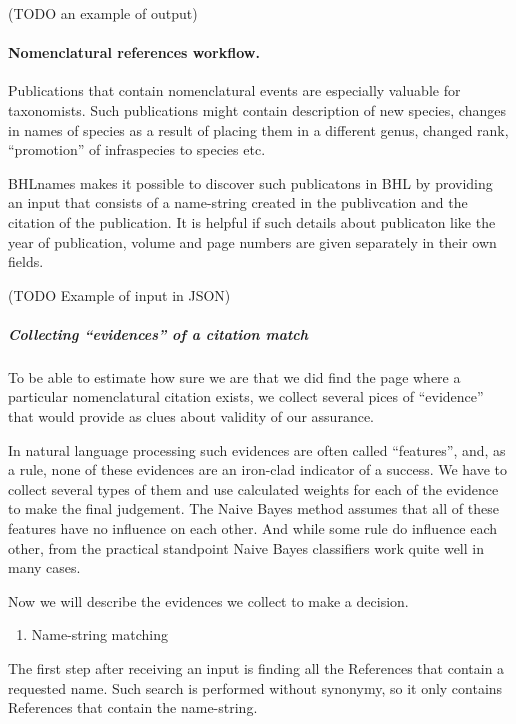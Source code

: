 \documentclass[
]{article}
\providecommand{\tightlist}{%
  \setlength{\itemsep}{0pt}\setlength{\parskip}{0pt}}
\begin{document}
(TODO an example of output)

\hypertarget{nomenclatural-references-workflow.}{%
\paragraph{Nomenclatural references
workflow.}\label{nomenclatural-references-workflow.}}

Publications that contain nomenclatural events are especially valuable
for taxonomists. Such publications might contain description of new
species, changes in names of species as a result of placing them in a
different genus, changed rank, ``promotion'' of infraspecies to species
etc.

BHLnames makes it possible to discover such publicatons in BHL by
providing an input that consists of a name-string created in the
publivcation and the citation of the publication. It is helpful if such
details about publicaton like the year of publication, volume and page
numbers are given separately in their own fields.

(TODO Example of input in JSON)

\hypertarget{collecting-evidences-of-a-citation-match}{%
\subparagraph{Collecting ``evidences'' of a citation
match}\label{collecting-evidences-of-a-citation-match}}

To be able to estimate how sure we are that we did find the page where a
particular nomenclatural citation exists, we collect several pices of
``evidence'' that would provide as clues about validity of our
assurance.

In natural language processing such evidences are often called
``features'', and, as a rule, none of these evidences are an iron-clad
indicator of a success. We have to collect several types of them and use
calculated weights for each of the evidence to make the final judgement.
The Naive Bayes method assumes that all of these features have no
influence on each other. And while some rule do influence each other,
from the practical standpoint Naive Bayes classifiers work quite well in
many cases.

Now we will describe the evidences we collect to make a decision.

\begin{enumerate}
\def\labelenumi{\arabic{enumi}.}
\tightlist
\item
  Name-string matching
\end{enumerate}

The first step after receiving an input is finding all the References
that contain a requested name. Such search is performed without
synonymy, so it only contains References that contain the name-string.
\end{document}
